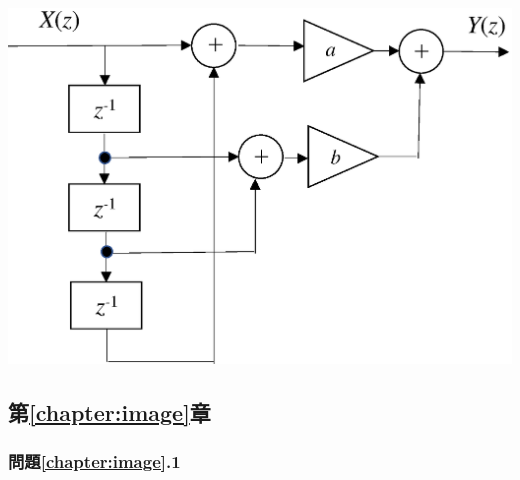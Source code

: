 \begin{center}
\includegraphics[width=.6\textwidth]{fig/zu-12e-1.eps}
\end{center}



\subsection*{第\ref{chapter:image}章}

\subsubsection*{問題\ref{chapter:image}.1}

